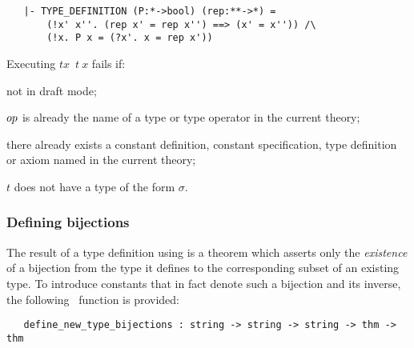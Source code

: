{\begin{hol}\begin{verbatim}
   |- TYPE_DEFINITION (P:*->bool) (rep:**->*) =
       (!x' x''. (rep x' = rep x'') ==> (x' = x'')) /\	
       (!x. P x = (?x'. x = rep x'))
\end{verbatim}\end{hol}

\noindent Executing $t$$x$\ $t\ x$\ml{)} fails if:
\begin{myenumerate}
\item not in draft mode;
\item ${\sl op}$ is already the name of a type or type operator 
in the current theory;
\item there already exists a constant definition, constant specification,
type definition or axiom named   in the current theory; 
\item $t$ does not have a type of the form $\sigma$\ml{->bool}.
\end{myenumerate}

\subsubsection{Defining bijections}

The result of a type definition using \ml{new\_type\_definition} is a theorem
which asserts only the {\it existence\/} of a
bijection 
from the type it defines to the corresponding subset of an existing type.  To
introduce constants that in fact denote such a bijection and its inverse, the
following \ML\ function is provided:

\begin{boxed}
\begin{verbatim}
   define_new_type_bijections : string -> string -> string -> thm -> thm
\end{verbatim}\end{boxed}

}
